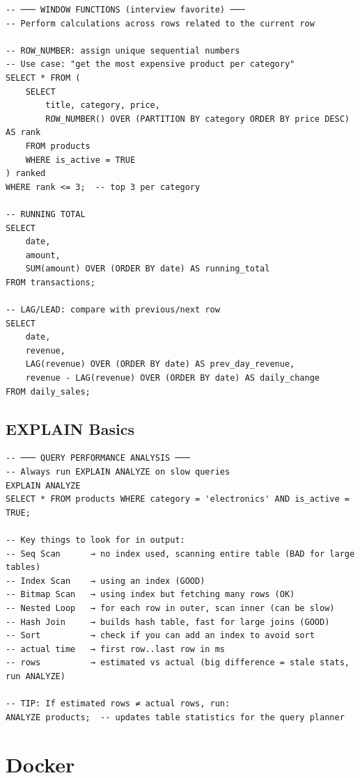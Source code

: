 \documentclass[10pt, a4paper]{article}
\begin{document}
\begin{lstlisting}[language=mysql]
-- ─── WINDOW FUNCTIONS (interview favorite) ───
-- Perform calculations across rows related to the current row

-- ROW_NUMBER: assign unique sequential numbers
-- Use case: "get the most expensive product per category"
SELECT * FROM (
    SELECT
        title, category, price,
        ROW_NUMBER() OVER (PARTITION BY category ORDER BY price DESC) AS rank
    FROM products
    WHERE is_active = TRUE
) ranked
WHERE rank <= 3;  -- top 3 per category

-- RUNNING TOTAL
SELECT
    date,
    amount,
    SUM(amount) OVER (ORDER BY date) AS running_total
FROM transactions;

-- LAG/LEAD: compare with previous/next row
SELECT
    date,
    revenue,
    LAG(revenue) OVER (ORDER BY date) AS prev_day_revenue,
    revenue - LAG(revenue) OVER (ORDER BY date) AS daily_change
FROM daily_sales;
\end{lstlisting}


\subsection{EXPLAIN Basics}


\begin{lstlisting}[language=mysql]
-- ─── QUERY PERFORMANCE ANALYSIS ───
-- Always run EXPLAIN ANALYZE on slow queries
EXPLAIN ANALYZE
SELECT * FROM products WHERE category = 'electronics' AND is_active = TRUE;

-- Key things to look for in output:
-- Seq Scan      → no index used, scanning entire table (BAD for large tables)
-- Index Scan    → using an index (GOOD)
-- Bitmap Scan   → using index but fetching many rows (OK)
-- Nested Loop   → for each row in outer, scan inner (can be slow)
-- Hash Join     → builds hash table, fast for large joins (GOOD)
-- Sort          → check if you can add an index to avoid sort
-- actual time   → first row..last row in ms
-- rows          → estimated vs actual (big difference = stale stats, run ANALYZE)

-- TIP: If estimated rows ≠ actual rows, run:
ANALYZE products;  -- updates table statistics for the query planner
\end{lstlisting}


\bigskip


\section{Docker}
\end{document}
